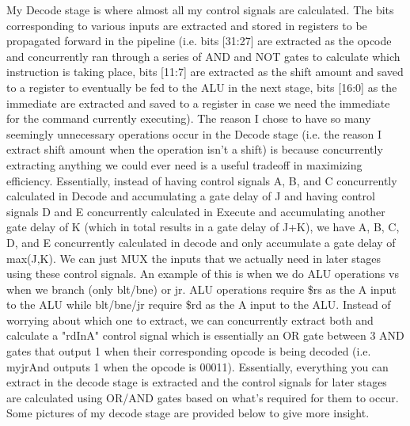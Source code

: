 \documentclass[letterpaper]{article} %
\begin{document}
    My Decode stage is where almost all my control signals are calculated. The bits corresponding to various inputs are extracted and stored in registers to be propagated forward in the pipeline (i.e. bits [31:27] are extracted as the opcode and concurrently ran through a series of AND and NOT gates to calculate which instruction is taking place, bits [11:7] are extracted as the shift amount and saved to a register to eventually be fed to the ALU in the next stage, bits [16:0] as the immediate are extracted and saved to a register in case we need the immediate for the command currently executing). The reason I chose to have so many seemingly unnecessary operations occur in the Decode stage (i.e. the reason I extract shift amount when the operation isn't a shift) is because concurrently extracting anything we could ever need is a useful tradeoff in maximizing efficiency. Essentially, instead of having control signals A, B, and C concurrently calculated in Decode and accumulating a gate delay of J and having control signals D and E concurrently calculated in Execute and accumulating another gate delay of K (which in total results in a gate delay of J+K), we have A, B, C, D, and E concurrently calculated in decode and only accumulate a gate delay of max(J,K). We can just MUX the inputs that we actually need in later stages using these control signals.  An example of this is when we do ALU operations vs when we branch (only blt/bne) or jr. ALU operations require \$rs as the A input to the ALU while blt/bne/jr require \$rd as the A input to the ALU. Instead of worrying about which one to extract, we can concurrently extract both and calculate a "rdInA" control signal which is essentially an OR gate between 3 AND gates that output 1 when their corresponding opcode is being decoded (i.e. myjrAnd outputs 1 when the opcode is 00011). Essentially, everything you can extract in the decode stage is extracted and the control signals for later stages are calculated using OR/AND gates based on what's required for them to occur. Some pictures of my decode stage are provided below to give more insight.
    
       \FloatBarrier
\end{document}
